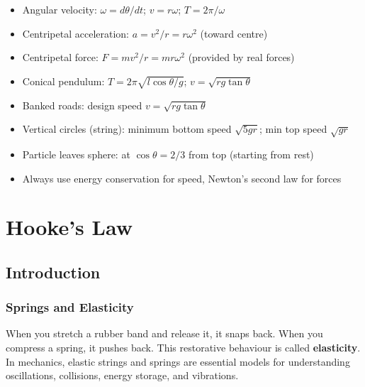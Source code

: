 \documentclass[12pt, a4paper]{book}
\begin{document}
\begin{summarybox}
\begin{itemize}[leftmargin=1.5em]
  \item Angular velocity: $\omega = d\theta/dt$; $v = r\omega$; $T = 2\pi/\omega$
  \item Centripetal acceleration: $a = v^2/r = r\omega^2$ (toward centre)
  \item Centripetal force: $F = mv^2/r = mr\omega^2$ (provided by real forces)
  \item Conical pendulum: $T = 2\pi\sqrt{l\cos\theta/g}$; $v = \sqrt{rg\tan\theta}$
  \item Banked roads: design speed $v = \sqrt{rg\tan\theta}$
  \item Vertical circles (string): minimum bottom speed $\sqrt{5gr}$; min top speed $\sqrt{gr}$
  \item Particle leaves sphere: at $\cos\theta = 2/3$ from top (starting from rest)
  \item Always use energy conservation for speed, Newton's second law for forces
\end{itemize}
\end{summarybox}

\chapter{Hooke's Law}

\section{Introduction}

\subsection{Springs and Elasticity}

When you stretch a rubber band and release it, it snaps back. When you compress a spring, it pushes back. This restorative behaviour is called \textbf{elasticity}. In mechanics, elastic strings and springs are essential models for understanding oscillations, collisions, energy storage, and vibrations.
\end{document}
